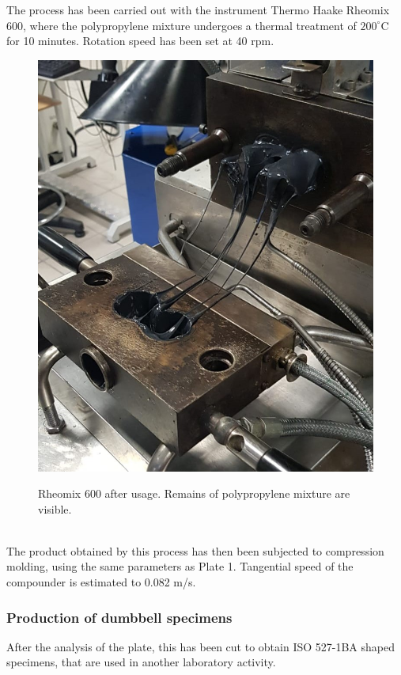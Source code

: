 \documentclass[a4paper, 11pt]{article}
\begin{document}
The process has been carried out with the instrument Thermo Haake Rheomix 600, where the polypropylene mixture undergoes a thermal treatment of $200^\circ$C for 10 minutes. Rotation speed has been set at 40 rpm.
\begin{figure}[htp]
	\centering
	\includegraphics[scale=0.3]
	{PHOTO-2019-05-23-17-37-35.jpg}
	\label{fig:rheo}
	\caption{Rheomix 600 after usage. Remains of polypropylene mixture are visible.}
\end{figure}\\
The product obtained by this process has then been subjected to compression molding, using the same parameters as Plate 1. Tangential speed of the compounder is estimated to 0.082 m/s.

\subsubsection{Production of dumbbell specimens}

After the analysis of the plate, this has been cut to obtain ISO 527-1BA shaped specimens, that are used in another laboratory activity.     
\end{document}
